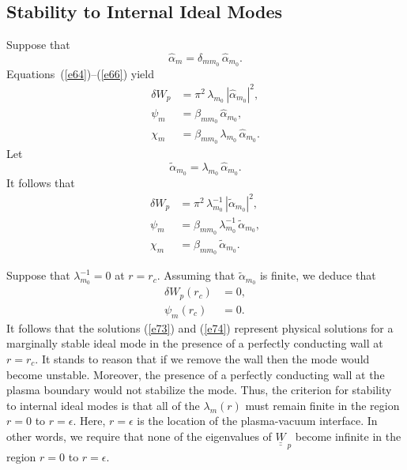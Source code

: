 \documentclass[12pt,prb,aps,notitlepage]{revtex4-1}
\begin{document}
\subsection{Stability to Internal Ideal Modes}
Suppose that
\begin{equation}
\hat{\alpha}_m = \delta_{mm_0}\,\hat{\alpha}_{m_0}.
\end{equation}
Equations~(\ref{e64})--(\ref{e66}) yield
\begin{align}
\delta W_p &= \pi^2\,\lambda_{m_0}\,|\hat{\alpha}_{m_0}|^2,\\[0.5ex]
\psi_m &= \beta_{mm_0}\,\hat{\alpha}_{m_0},\label{e73}\\[0.5ex]
\chi_m &=  \beta_{mm_0}\,\lambda_{m_0}\,\hat{\alpha}_{m_0}.\label{e74}
\end{align}
Let 
\begin{equation}
\widetilde{\alpha}_{m_0} = \lambda_{m_0}\,\hat{\alpha}_{m_0}.
\end{equation}
It follows that 
\begin{align}
\delta W_p&=\pi^2\, \lambda_{m_0}^{-1}\,|\widetilde{\alpha}_{m_0}|^2,\\[0.5ex]
\psi_m &= \beta_{mm_0}\,\lambda_{m_0}^{-1}\,\widetilde{\alpha}_{m_0},\\[0.5ex]
\chi_m&=  \beta_{mm_0}\,\widetilde{\alpha}_{m_0}.
\end{align}

Suppose that $\lambda_{m_0}^{-1}=0$ at $r=r_c$. Assuming that $\widetilde{\alpha}_{m_0}$ is finite, we deduce that
\begin{align}
\delta W_p(r_c) &=0,\\[0.5ex]
\psi_m(r_c) &= 0.
\end{align}
It follows that the solutions (\ref{e73}) and (\ref{e74}) represent physical solutions for a marginally stable ideal mode in the presence of a
perfectly conducting wall at $r=r_c$. It stands to reason that if we remove the wall then the mode would become unstable. Moreover, the
presence of a perfectly conducting wall at the plasma boundary would not stabilize the mode. Thus, the criterion for stability to internal ideal
modes is that all of the $\lambda_m(r)$ must remain finite in the region $r=0$ to $r=\epsilon$. Here, $r=\epsilon$ is the location of the plasma-vacuum interface. In other words, we require that none of the
eigenvalues of $\underline{\underline{W}}_{\,p}$ become infinite in the region $r=0$ to $r=\epsilon$. 
\end{document}
